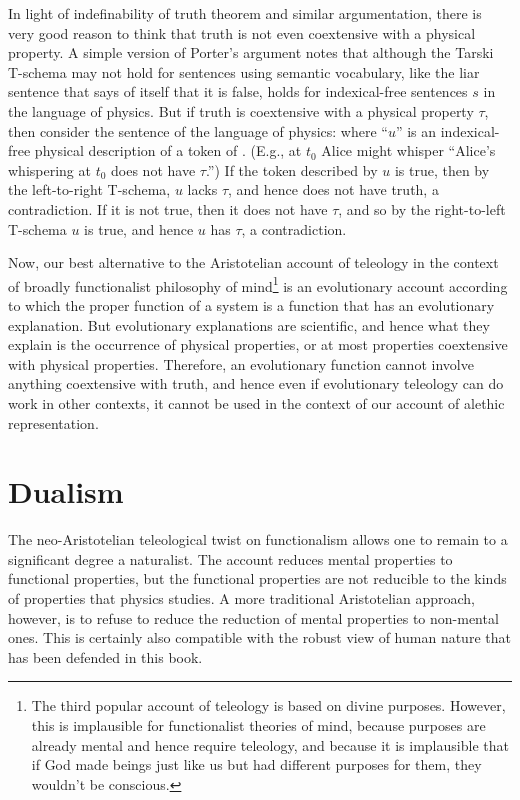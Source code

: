 In light of  indefinability of truth theorem and  similar argumentation, there is very good 
reason to think that truth is not even coextensive with a physical property. A simple version of Porter's argument notes that although the Tarski T-schema 
may not hold for sentences using semantic vocabulary, like the liar sentence that says of itself that it is false,
 holds for indexical-free sentences $s$ in the language of physics.
But if truth is coextensive with a physical property $\tau$, then consider the sentence of the language of physics:
where ``$u$'' is an indexical-free physical description of a token of . (E.g., at $t_0$ Alice might whisper ``Alice's whispering 
at $t_0$ does not have $\tau$.'') If the token described by $u$ is true, then by the left-to-right T-schema, $u$ lacks $\tau$, and hence
does not have truth, a contradiction. If it is not true, then it does not have $\tau$, and so by the right-to-left T-schema $u$ is true, and hence $u$ has $\tau$, a contradiction. 

Now, our best alternative to the Aristotelian account of teleology in the context of broadly functionalist philosophy of mind\footnote{The third popular account of teleology is based on divine purposes. However, this
is implausible for functionalist theories of mind, because purposes are already mental and hence require teleology,
and because it is implausible that if God made beings just like us but had different purposes for them, they wouldn't be conscious.} is an evolutionary account according to which the 
proper function of a system is a function that has an evolutionary explanation. But evolutionary explanations are 
scientific, and hence what they explain is the occurrence of physical properties, or at most properties coextensive 
with physical properties. Therefore, an evolutionary function cannot involve anything coextensive with truth, and hence 
even if evolutionary teleology can do work in other contexts, it cannot be used in the context of our account of 
alethic representation.

\section{Dualism}\label{sec:dualism}
The neo-Aristotelian teleological twist on functionalism allows one to remain to a significant degree a naturalist. The account reduces mental properties to functional properties, but the functional properties are not 
reducible to the kinds of properties that physics studies. A more traditional Aristotelian approach, however, is to refuse
to reduce the reduction of mental properties to non-mental ones. This is certainly also compatible with the robust view of
human nature that has been defended in this book. 

